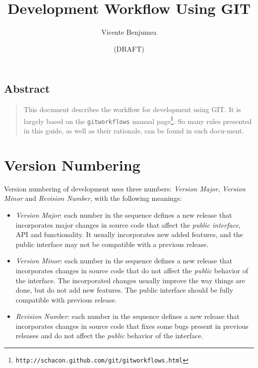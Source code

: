 \documentclass[a4paper]{article}
\title{Development Workflow Using GIT}
\author{Vicente Benjumea}
\date{(DRAFT)}
\begin{document}
\maketitle
\subsection*{Abstract}
\begin{quote}\small
This document describes the workflow for development using
GIT. It is largely based on the \verb|gitworkflows| manual
page\footnote{\texttt{http://schacon.github.com/git/gitworkflows.html}}. So
many rules presented in this guide, as well as their rationale, can be
found in such docu-ment.
\end{quote}
\section{Version Numbering}
Version numbering of development uses three numbers: \emph{Version
  Major}, \emph{Version Minor} and \emph{Revision Number}, with the
following meanings: \par{\footnotesize\begin{itemize}%
\item \emph{Version Major}: each number in the sequence defines a new
  release that incorporates major changes in source code that affect
  the \emph{public interface}, API and functionality. It usually
  incorporates new added features, and the public interface may not be
  compatible with a previous release.
\item \emph{Version Minor}: each number in the sequence defines a new
  release that incorporates changes in source code that do not affect
  the \emph{public} behavior of the interface. The incorporated
  changes usually improve the way things are done, but do not add new
  features. The public interface should be fully compatible with
  previous release.
\item \emph{Revision Number}: each number in the sequence defines a
  new release that incorporates changes in source code that fixes some
  bugs present in previous releases and do not affect the
  \emph{public} behavior of the interface.
\end{itemize}}%
\end{document}
